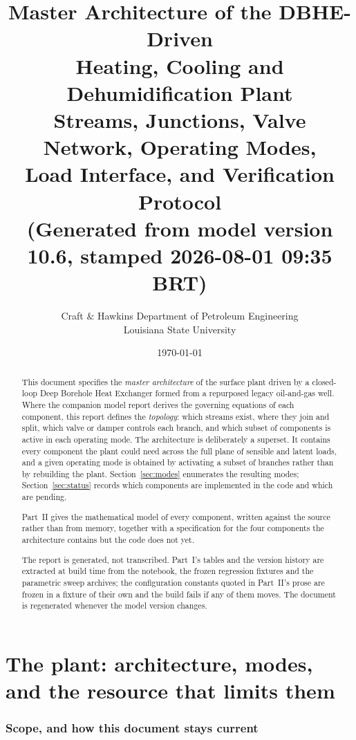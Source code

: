 \documentclass[11pt]{article}
\title{\textbf{Master Architecture of the DBHE-Driven\\
Heating, Cooling and Dehumidification Plant}\\[6pt]
\large Streams, Junctions, Valve Network, Operating Modes,\\
Load Interface, and Verification Protocol\\[4pt]
\normalsize (Generated from model version 10.6, stamped 2026-08-01 09:35 BRT)}
\author{Craft \& Hawkins Department of Petroleum Engineering\\
Louisiana State University}
\date{\today}
\begin{document}
\maketitle

\begin{abstract}
This document specifies the \emph{master architecture} of the surface plant
driven by a closed-loop Deep Borehole Heat Exchanger formed from a repurposed
legacy oil-and-gas well. Where the companion model report derives the governing
equations of each component, this report defines the \emph{topology}: which
streams exist, where they join and split, which valve or damper controls each
branch, and which subset of components is active in each operating mode.
The architecture is deliberately a superset. It contains every component the
plant could need across the full plane of sensible and latent loads, and a
given operating mode is obtained by activating a subset of branches rather
than by rebuilding the plant. Section~\ref{sec:modes} enumerates the resulting
modes; Section~\ref{sec:status} records which components are implemented in the
code and which are pending.

Part~II gives the mathematical model of every component, written against the
source rather than from memory, together with a specification for the four
components the architecture contains but the code does not yet.

The report is generated, not transcribed. Part~I's tables and the version
history are extracted at build time from the notebook, the frozen regression
fixtures and the parametric sweep archives; the configuration constants quoted
in Part~II's prose are frozen in a fixture of their own and the build fails if
any of them moves. The document is regenerated whenever the model version
changes.
\end{abstract}

\tableofcontents
\newpage

\part{The plant: architecture, modes, and the resource that limits them}

\section{Scope, and how this document stays current}
\end{document}
